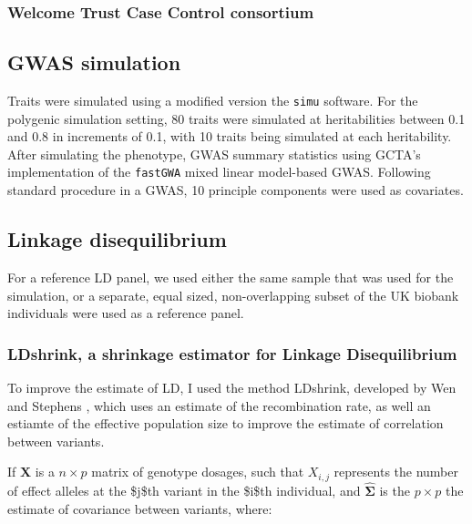{\subsubsection{Welcome Trust Case Control consortium}\label{sec:orgec3f022}




\subsection{GWAS simulation}\label{sec:orgad711ec}

Traits were simulated using a modified version the \texttt{simu} software. For the polygenic simulation setting, 80 traits were simulated at heritabilities between 0.1 and 0.8 in increments of 0.1, with 10 traits
being simulated at each heritability.  After simulating the phenotype, GWAS summary statistics using GCTA's implementation of the \texttt{fastGWA} mixed linear model-based GWAS.  Following standard procedure in a GWAS,
10 principle components were used as covariates. 


\subsection{Linkage disequilibrium}\label{sec:org828aaeb}

For a reference LD panel, we used either the same sample that was used for the simulation, or a separate, equal sized, 
non-overlapping subset of the UK biobank individuals were used as a reference panel.  


\subsubsection{LDshrink, a shrinkage estimator for Linkage Disequilibrium}\label{sec:orgae044da}

To improve the estimate of LD, I used the method LDshrink, developed by Wen and Stephens \cite{Wen_2010}, which uses an estimate of 
the recombination rate, as well an estiamte of the effective population size to improve the estimate of correlation between variants.

If \(\boldsymbol{X}\) is a \(n \times p\) matrix of genotype dosages, such that \(X_{i,j}\) represents the number of effect alleles at the \$j\$th variant in the \$i\$th individual, and \(\hat{\boldsymbol{\Sigma}}\) is the \(p \times p\)  the estimate of covariance between
variants, where:

}
